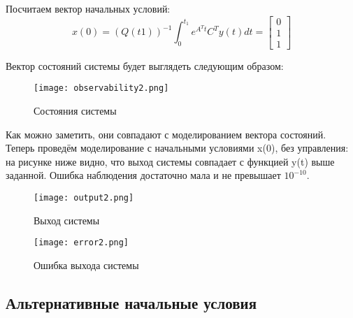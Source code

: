 Посчитаем вектор начальных условий:
$$
    x(0) = (Q(t1))^{-1}\int_{0}^{t_1}e^{A^Tt}C^Ty(t)dt = 
    \begin{bmatrix}
        0\\1\\1
    \end{bmatrix}
$$

Вектор состояний системы будет выглядеть следующим образом:
\begin{figure}[ht]
  \centering
  \texttt{[image: observability2.png]}
  \caption{Состояния системы}
\end{figure}

Как можно заметить, они совпадают с моделированием вектора состояний.
\newpage
Теперь проведём моделирование с начальными условиями x(0), без управления: на рисунке ниже видно,
что выход системы совпадает с функцией y(t) выше заданной. Ошибка наблюдения достаточно мала и не превышает $10^{-10}$.

\begin{figure}[ht]
    \centering
    \texttt{[image: output2.png]}
    \caption{Выход системы}
  \end{figure}

\begin{figure}[ht]
    \centering
    \texttt{[image: error2.png]}
    \caption{Ошибка выхода системы}
  \end{figure}

\newpage
\newpage
\subsection{Альтернативные начальные условия}

